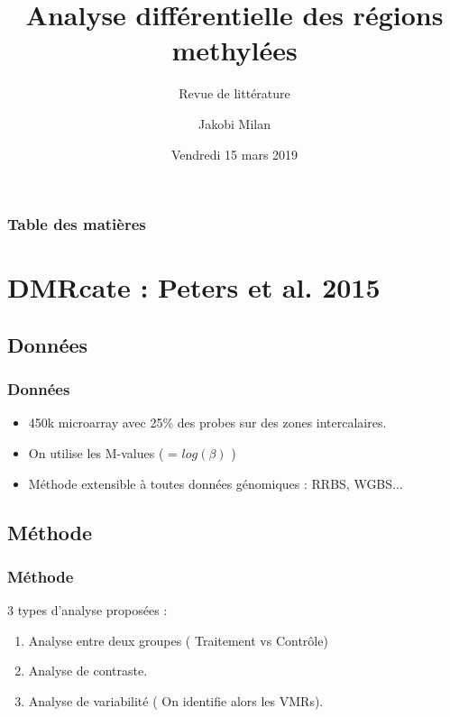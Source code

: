 \documentclass{beamer}
\begin{document}
\title[identification DMRs] 
{Analyse différentielle des régions methylées}
\subtitle{Revue de littérature}
\author{Jakobi Milan}
\date[KPT 2004]{Vendredi 15 mars 2019}






\frame{\titlepage}

\begin{frame}
\frametitle{Table des matières}
\tableofcontents
\end{frame}


\section{DMRcate : Peters et al. 2015}
\subsection{Données}

\begin{frame}
\frametitle{Données}
\begin{itemize}
\item<1-> 450k microarray avec 25\% des probes sur des zones intercalaires.
\item<1-> On utilise les M-values ( = $log(\beta)$ )
\item<2-> Méthode extensible à toutes données génomiques : RRBS, WGBS...

\end{itemize}
\end{frame}

\subsection{Méthode}
\begin{frame}
\frametitle{Méthode}
3 types d'analyse proposées :
\begin{enumerate}
\item<2-> Analyse entre deux groupes ( Traitement vs Contrôle)
\item<2-> Analyse de contraste.
\item<2-> Analyse de variabilité ( On identifie alors les VMRs).
\end{enumerate}
\end{frame}
\end{document}
